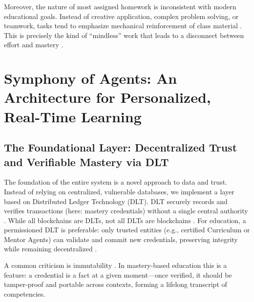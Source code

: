 \documentclass[12pt,a4paper]{article}
\begin{document}
Moreover, the nature of most assigned homework is inconsistent with modern educational goals. Instead of creative application, complex problem solving, or teamwork, tasks tend to emphasize mechanical reinforcement of class material \autocite{birch2018}. This is precisely the kind of \enquote{mindless} work that leads to a disconnect between effort and mastery \autocite{pope2013}.


\section{Symphony of Agents: An Architecture for Personalized, Real-Time Learning}

\subsection{The Foundational Layer: Decentralized Trust and Verifiable Mastery via DLT}
The foundation of the entire system is a novel approach to data and trust. Instead of relying on centralized, vulnerable databases, we implement a layer based on Distributed Ledger Technology (DLT). DLT securely records and verifies transactions (here: mastery credentials) without a single central authority \autocite{gao2019}. While all blockchains are DLTs, not all DLTs are blockchains \autocite{finra2017,investopedia2024}. For education, a permissioned DLT is preferable: only trusted entities (e.g., certified Curriculum or Mentor Agents) can validate and commit new credentials, preserving integrity while remaining decentralized \autocite{investopedia2024,gao2019}.

A common criticism is immutability \autocite{gao2019}. In mastery-based education this is a feature: a credential is a fact at a given moment---once verified, it should be tamper-proof and portable across contexts, forming a lifelong transcript of competencies.
\end{document}
